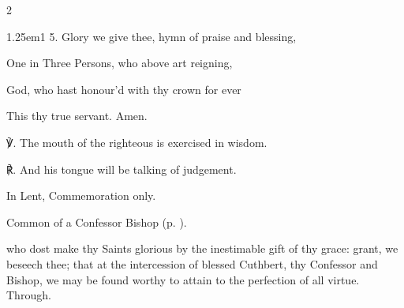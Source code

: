 \begin{paracol}{2}
\begin{hangparas}{1.25em}{1}
5. Glory we give thee, hymn of praise and blessing,

One in Three Persons, who above art reigning,

God, who hast honour'd with thy crown for ever

This thy true servant. Amen.\\
\end{hangparas}

    ℣. The mouth of the righteous is exercised in wisdom.

	℟. And his tongue will be talking of judgement.



\end{paracol}




\begin{rubric}
	In Lent, Commemoration only.
\end{rubric}

\begin{rubric}
	Common of a Confessor Bishop (p. \pageref{CommonConfessorBishop}).
\end{rubric}

{} who dost make thy Saints glorious by the inestimable gift of thy grace: grant, we beseech thee; that at the intercession of blessed Cuthbert, thy Confessor and Bishop, we may be found worthy to attain to the perfection of all virtue. Through.


\clearpage
{}

